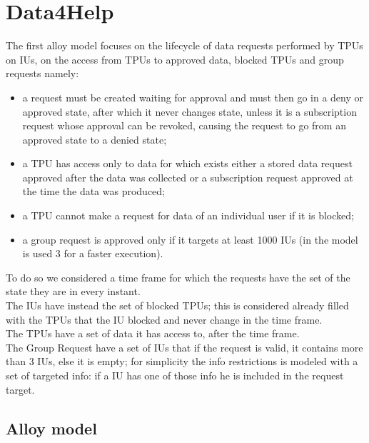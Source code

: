 \section{Data4Help}
The first alloy model focuses on the lifecycle of data requests performed by TPUs on IUs, on the access from TPUs to approved data, blocked TPUs and group requests namely:
\begin{itemize}
\item a request must be created waiting for approval and must then go in a deny or approved state, after which it never changes state, unless it is a subscription request whose approval can be revoked, causing the request to go from an approved state to a denied state;
\item a TPU has access only to data for which exists either a stored data request approved after the data was collected or a subscription request approved at the time the data was produced;
\item a TPU cannot make a request for data of an individual user if it is blocked;
\item a group request is approved only if it targets at least 1000 IUs (in the model is used 3 for a faster execution).
\end{itemize}
To do so we considered a time frame for which the requests have the set of the state they are in every instant.  \\
The IUs have instead the set of blocked TPUs; this is considered already filled with the TPUs that the IU blocked and never change in the time frame. \\ 
The TPUs have a set of data it has access to, after the time frame. \\
The Group Request have a set of IUs that if the request is valid, it contains more than 3 IUs, else it is empty; for simplicity the info restrictions is modeled with a set of targeted info: if a IU has one of those info he is included in the request target.
\\
\subsection{Alloy model}

